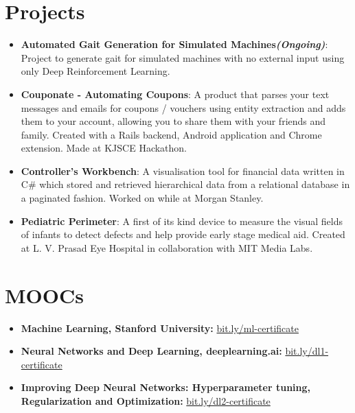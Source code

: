 \documentclass[letterpaper,8pt]{article}
\newcommand{\resumeItem}[2]{
  \item\small{
    \textbf{#1}{: #2 \vspace{-2pt}}
  }
}
\newcommand{\resumeSubItem}[2]{\resumeItem{#1}{#2}\vspace{-4pt}}
\newcommand{\resumeSubHeadingListStart}{\begin{itemize}[leftmargin=*]}
\newcommand{\resumeSubHeadingListEnd}{\end{itemize}}
\begin{document}
\section{Projects}
  \resumeSubHeadingListStart
    \resumeSubItem{Automated Gait Generation for Simulated Machines{\em (Ongoing)}}
      {Project to generate gait for simulated machines with no external input using only Deep Reinforcement Learning.}
    \resumeSubItem{Couponate - Automating Coupons}
      {A product that parses your text messages and emails for coupons / vouchers using entity extraction and adds them to your account, allowing you to share them with your friends and family. Created with a Rails backend, Android application and Chrome extension. Made at KJSCE Hackathon.}
    \resumeSubItem{Controller's Workbench}
      {A visualisation tool for financial data written in C\# which stored and retrieved hierarchical data from a relational database in a paginated fashion. Worked on while at Morgan Stanley.}
    \resumeSubItem{Pediatric Perimeter}
      {A first of its kind device to measure the visual fields of infants to detect defects and help provide early stage medical aid. Created at L. V. Prasad Eye Hospital in collaboration with MIT Media Labs.}
  \resumeSubHeadingListEnd

\section{MOOCs}
  \resumeSubHeadingListStart
    \item{
      \textbf{Machine Learning, Stanford University}{\textbf{:} \href{http://bit.ly/ml-certificate}{bit.ly/ml-certificate}}
      \hfill
    }
    \vspace{-4pt}
    \item{
      \textbf{Neural Networks and Deep Learning, deeplearning.ai}{\textbf{:} \href{http://bit.ly/dl1-certificate}{bit.ly/dl1-certificate}}
      \hfill
    }
    \vspace{-4pt}
    \item{
      \textbf{Improving Deep Neural Networks: Hyperparameter tuning, Regularization and Optimization}{\textbf{:} \href{http://bit.ly/dl2-certificate}{bit.ly/dl2-certificate}}
      \hfill
    }
  \resumeSubHeadingListEnd
\end{document}
